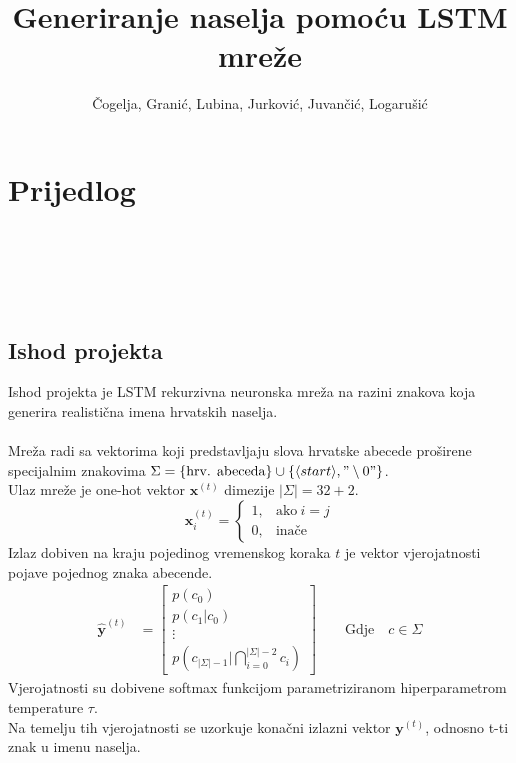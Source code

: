 \documentclass{report}
\title{Generiranje naselja pomoću LSTM mreže}
\author{Čogelja, Granić, Lubina, Jurković, Juvančić, Logarušić}
\begin{document}
\maketitle

\chapter*{Prijedlog}
\ \\
\\
\\
\\

\section{Ishod projekta}
Ishod projekta je LSTM rekurzivna neuronska mreža na razini znakova koja generira realistična imena hrvatskih naselja.\\
\\
Mreža radi sa vektorima koji predstavljaju slova hrvatske abecede proširene specijalnim znakovima $\Sigma = \{ \text{hrv. abeceda}\} \cup \{\langle start \rangle, "\setminus 0"\}$.\\
Ulaz mreže je one-hot vektor $\mathbf{x}^{(t)}$ dimezije $\lvert \Sigma \rvert = 32 + 2$.
\begin{equation}
\mathbf{x}^{(t)}_i=
    \begin{cases}
      1, & \text{ako}\ i=j \\
      0, & \text{inače}
    \end{cases}
\end{equation}
Izlaz dobiven na kraju pojedinog vremenskog koraka $t$ je vektor vjerojatnosti pojave pojednog znaka abecende.\\
\begin{align}
    \hat{\mathbf{y}}^{(t)} &= \begin{bmatrix}
           p(c_0) \\
           p(c_1 | c_0) \\
           \vdots \\
           p(c_{\lvert \Sigma \rvert -1} | \bigcap_{i=0}^{\lvert \Sigma \rvert -2} c_i)
         \end{bmatrix}
         \quad \quad \text{Gdje} \quad c \in \Sigma
\end{align}
Vjerojatnosti su dobivene softmax funkcijom parametriziranom hiperparametrom temperature $\tau$.\\
Na temelju tih vjerojatnosti se uzorkuje konačni izlazni vektor $\mathbf{y}^{(t)}$, odnosno t-ti znak u imenu naselja.\\
\end{document}
